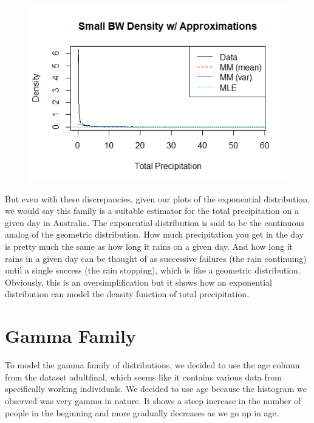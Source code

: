 \documentclass[12pt, a4paper, oneside]{report}
\begin{document}
\begin{figure}[h]
  \centering
  \includegraphics[width=0.7 \linewidth]{expDensitySmallA.png} %
\end{figure}


But even with these discrepancies, given our plots of the exponential distribution, we would say this family is a suitable estimator for the total precipitation on a given day in Australia. The exponential distribution is said to be the continuous analog of the geometric distribution. How much precipitation you get in the day is pretty much the same as how long it rains on a given day. And how long it rains in a given day can be thought of as successive failures (the rain continuing) until a single success (the rain stopping), which is like a geometric distribution. Obviously, this is an oversimplification but it shows how an exponential distribution can model the density function of total precipitation.



















\newpage
\section*{Gamma Family}
To model the gamma family of distributions, we decided to use the age column from the dataset adultfinal, which seems like it contains various data from specifically working individuals. We decided to use age because the histogram we observed was very gamma in nature. It shows a steep increase in the number of people in the beginning and more gradually decreases as we go up in age.
\end{document}
